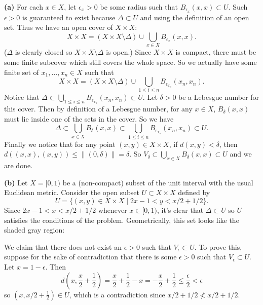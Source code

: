 \documentclass[11pt,letterpaper]{article}
\begin{document}
\begin{solution}
    \textbf{(a)} For each $x\in X$, let $\epsilon_x>0$ be some radius such that $B_{\epsilon_x}(x,x)\subset U$. Such $\epsilon>0$ is guaranteed to exist because $\Delta\subset U$ and using the definition of an open set. Thus we have an open cover of $X\times X$:
    \[
        X\times X = (X\times X \setminus \Delta)\cup\bigcup_{x\in X} B_{\epsilon_x}(x,x).
    \] 
    ($\Delta$ is clearly closed so $X\times X\setminus \Delta$ is open.) Since $X\times X$ is compact, there must be some finite subcover which still covers the whole space. So we actually have some finite set of $x_1,\ldots,x_{n}\in X$ such that
    \[
        X\times X=(X\times X\setminus \Delta)\cup \bigcup_{1\leq i \leq n} B_{\epsilon_{x_n}}(x_n,x_n).
    \] 
    Notice that $\Delta\subset\bigcup_{1\leq i \leq n} B_{\epsilon_{x_n}}(x_n, x_n)\subset U$. Let $\delta>0$ be a Lebesgue number for this cover. Then by definition of a Lebesgue number, for any $x\in X$, $B_{\delta}(x,x)$ must lie inside one of the sets in the cover. So we have \[\Delta \subset \bigcup_{x\in X} B_{\delta}(x,x) \subset \bigcup_{1\leq i \leq n} B_{\epsilon_{x_n}}(x_n, x_n)\subset U.\]
    Finally we notice that for any point $(x,y)\in X\times X$, if $d(x,y)<\delta$, then $d((x,x), (x,y))\leq \|(0,\delta)\|=\delta$. So $V_\delta \subset \bigcup_{x\in X} B_\delta(x,x)\subset U$ and we are done.

    \textbf{(b)} Let $X=[0,1)$ be a (non-compact) subset of the unit interval with the usual Euclidean metric. Consider the open subset $U\subset X\times X$ defined by
    \[
        U=\{(x,y)\in X\times X\mid 2x-1 < y < x/2+1/2\}.
    \] 
    Since $2x-1 < x < x/2 + 1/2$ whenever $x\in [0,1)$, it's clear that $\Delta\subset U$ so $U$ satisfies the conditions of the problem. Geometrically, this set looks like the shaded gray region:
    \begin{center}
    \end{center}
    We claim that there does not exist an $\epsilon>0$ such that $V_\epsilon \subset U$. To prove this, suppose for the sake of contradiction that there is some $\epsilon>0$ such that $V_\epsilon \subset U$. Let $x=1-\epsilon$. Then 
    \[
        d\left(x, \frac{x}{2}+\frac12\right) = \frac{x}{2}+\frac12 - x = -\frac{x}{2}+\frac{1}{2} \leq \frac{\epsilon}{2}<\epsilon
    \] 
    so $(x, x/2+\frac12)\in U$, which is a contradiction since $x/2+1/2\not< x/2+1/2$.
\end{solution}
\end{document}
